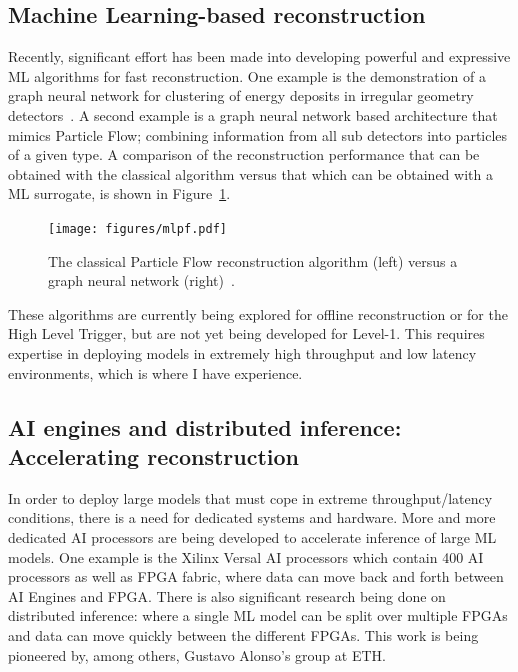 \documentclass[12pt]{iopart}
\begin{document}
\subsection{Machine Learning-based reconstruction}
Recently, significant effort has been made into developing powerful and expressive ML algorithms for fast reconstruction. One example is the demonstration of a graph neural network for clustering of energy deposits in irregular geometry detectors~\cite{garnet}. A second example is a graph neural network based architecture that mimics Particle Flow; combining information from all sub detectors into particles of a given type. A comparison of the reconstruction performance that can be obtained with the classical algorithm versus that which can be obtained with a ML surrogate, is shown in Figure~\ref{fig:mlpf}.
\begin{figure}[ht]
    \centering
    \texttt{[image: figures/mlpf.pdf]}
    \caption{The classical Particle Flow reconstruction algorithm (left) versus a graph neural network (right)~\cite{mlpf}.}
    \label{fig:mlpf}
\end{figure}
These algorithms are currently being explored for offline reconstruction or for the High Level Trigger, but are not yet being developed for Level-1. This requires expertise in deploying models in extremely high throughput and low latency environments, which is where I have experience.

\subsection{AI engines and distributed inference: Accelerating reconstruction}
In order to deploy large models that must cope in extreme throughput/latency conditions, there is a need for dedicated systems and hardware. More and more dedicated AI processors are being developed to accelerate inference of large ML models. One example is the Xilinx Versal AI processors which contain 400 AI processors as well as FPGA fabric, where data can move back and forth between AI Engines and FPGA. There is also significant research being done on distributed inference: where a single ML model can be split over multiple FPGAs and data can move quickly between the different FPGAs. This work is being pioneered by, among others, Gustavo Alonso's group at ETH. 
\end{document}

